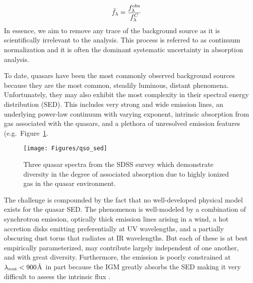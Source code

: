 \documentclass[graybox]{svmult}
\begin{document}
\begin{equation}
\bar f_\lambda = \frac{f_\lambda^{\rm obs}}{f_\lambda^C}
\end{equation}
In essence, we aim to remove any trace of the background
source as it is scientifically irrelevant to the analysis.
This process is referred to as continuum normalization and
it is often the dominant systematic uncertainty in absorption
analysis.

To date, quasars have been the most commonly observed background
sources because they are the most common, steadily luminous, distant
phenomena.   Unfortunately, they may also exhibit the most complexity
in their spectral energy distribution (SED).  This includes
very strong and wide emission lines, an underlying power-law
continuum with varying exponent, intrinsic absorption from gas
associated with the quasars, and a plethora of unresolved emission
features (e.g.\ Figure~\ref{fig:qso_SED}.


%
\begin{figure}[b]
\sidecaption
\texttt{[image: Figures/qso\_sed]}
%
%
\caption{Three quasar spectra from the SDSS survey
which demonstrate diversity in the degree of associated
absorption due to highly ionized gas in the quasar
environment.
}
\label{fig:qso_SED}       %
\end{figure}

The challenge is compounded by the fact that no well-developed physical
model exists for the quasar SED.  The phenomenon is well-modeled
by a combination of synchrotron emission, optically thick
emission lines arising in a wind, a hot accretion disks 
emitting preferentially at UV wavelengths, and a partially
obscuring dust torus that radiates at IR wavelengths.
But each of these is at best empirically parameterized, may
contribute largely independent of one another, and 
with great diversity.  Furthermore, the emission is
poorly constrained at $\lambda_{\rm rest} < 900$\AA\
in part because the IGM greatly absorbs the SED
making it very difficult to assess the intrinsic flux 
\cite[see][]{lusso+15}.
\end{document}
